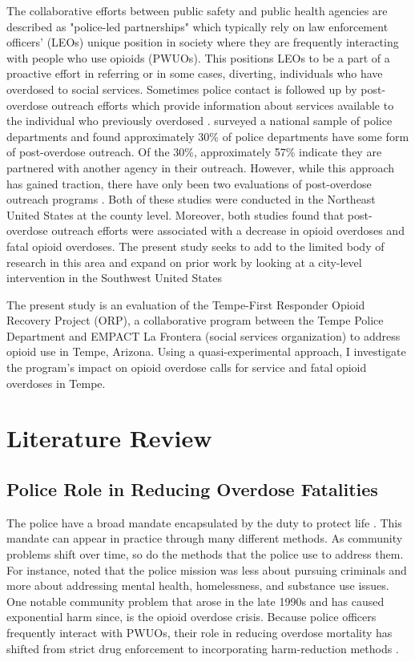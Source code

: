 The collaborative efforts between public safety and public health agencies are described as "police-led partnerships" which typically rely on law enforcement officers' (LEOs) unique position in society where they are frequently interacting with people who use opioids (PWUOs). This positions LEOs to be a part of a proactive effort in referring or in some cases, diverting, individuals who have overdosed to social services. Sometimes police contact is followed up by post-overdose outreach efforts which provide information about services available to the individual who previously overdosed \parencite{formica_characteristics_2021}. \textcite{ray_national_2023} surveyed a national sample of police departments and found approximately 30\% of police departments have some form of post-overdose outreach. Of the 30\%, approximately 57\% indicate they are partnered with another agency in their outreach. However, while this approach has gained traction, there have only been two evaluations of post-overdose outreach programs \parencite{donnelly_law_2022, xuan_association_2023}. Both of these studies were conducted in the Northeast United States at the county level. Moreover, both studies found that post-overdose outreach efforts were associated with a decrease in opioid overdoses and fatal opioid overdoses. The present study seeks to add to the limited body of research in this area and expand on prior work by looking at a city-level intervention in the Southwest United States

The present study is an evaluation of the Tempe-First Responder Opioid Recovery Project (ORP), a collaborative program between the Tempe Police Department and EMPACT La Frontera (social services organization) to address opioid use in Tempe, Arizona. Using a quasi-experimental approach, I investigate the program's impact on opioid overdose calls for service and fatal opioid overdoses in Tempe. 

\section{\centering Literature Review}
\subsection{Police Role in Reducing Overdose Fatalities}

The police have a broad mandate encapsulated by the duty to protect life \parencite{skolnick_above_1993}. This mandate can appear in practice through many different methods. As community problems shift over time, so do the methods that the police use to address them. For instance, \textcite{bittner_florence_1974} noted that the police mission was less about pursuing criminals and more about addressing mental health, homelessness, and substance use issues. One notable community problem that arose in the late 1990s and has caused exponential harm since, is the opioid overdose crisis. Because police officers frequently interact with PWUOs, their role in reducing overdose mortality has shifted from strict drug enforcement to incorporating harm-reduction methods \parencite{beckett_uses_2016}.

